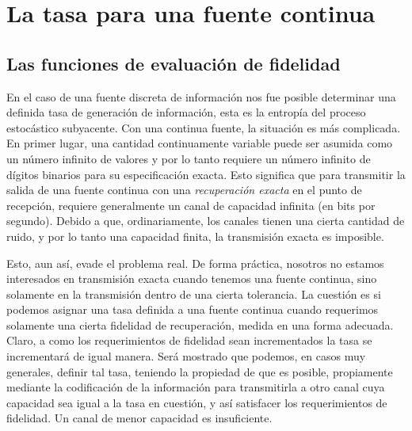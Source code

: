\clearpage

\part{La tasa para una fuente continua}
\label{part:5}

\chapter{Las funciones de evaluaci\'{o}n de fidelidad}
\label{sec:27}

En el caso de una fuente discreta de informaci\'on nos fue posible
determinar una definida tasa de generaci\'on de informaci\'on, esta es
la entrop\'ia del proceso estoc\'astico subyacente. Con una continua
fuente, la situaci\'on es m\'as complicada. En primer lugar, una
cantidad continuamente variable puede ser asumida como un n\'umero
infinito de valores y por lo tanto requiere un n\'umero infinito de
d\'igitos binarios para su especificaci\'on exacta. Esto significa que
para transmitir la salida de una fuente continua con una {\em
 recuperaci\'on exacta} en el punto de recepci\'on, requiere
generalmente un canal de capacidad infinita (en bits por
segundo). Debido a que, ordinariamente, los canales tienen una cierta
cantidad de ruido, y por lo tanto una capacidad finita, la
transmisi\'on exacta es imposible.

Esto, aun as\'i, evade el problema real. De forma pr\'actica, nosotros
no estamos interesados en transmisi\'on exacta cuando tenemos una
fuente continua, sino solamente en la transmisi\'on dentro de una
cierta tolerancia. La cuesti\'on es si podemos asignar una tasa
definida a una fuente continua cuando requerimos solamente una cierta
fidelidad de recuperaci\'on, medida en una forma adecuada. Claro, a
como los requerimientos de fidelidad sean incrementados la tasa se
incrementar\'a de igual manera. Ser\'a mostrado que podemos, en casos
muy generales, definir tal tasa, teniendo la propiedad de que es
posible, propiamente mediante la codificaci\'on de la informaci\'on
para transmitirla a otro canal cuya capacidad sea igual a la tasa en
cuesti\'on, y as\'i satisfacer los requerimientos de fidelidad. Un
canal de menor capacidad es insuficiente.

